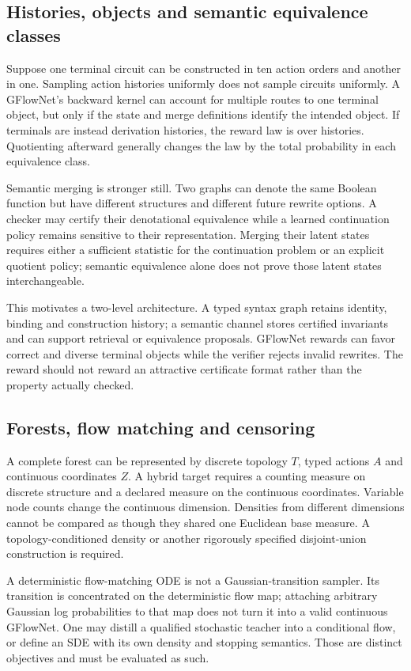 \subsection{Histories, objects and semantic equivalence classes}

Suppose one terminal circuit can be constructed in ten action orders and another in one. Sampling action histories uniformly does not sample circuits uniformly. A GFlowNet's backward kernel can account for multiple routes to one terminal object, but only if the state and merge definitions identify the intended object. If terminals are instead derivation histories, the reward law is over histories. Quotienting afterward generally changes the law by the total probability in each equivalence class.

Semantic merging is stronger still. Two graphs can denote the same Boolean function but have different structures and different future rewrite options. A checker may certify their denotational equivalence while a learned continuation policy remains sensitive to their representation. Merging their latent states requires either a sufficient statistic for the continuation problem or an explicit quotient policy; semantic equivalence alone does not prove those latent states interchangeable.

This motivates a two-level architecture. A typed syntax graph retains identity, binding and construction history; a semantic channel stores certified invariants and can support retrieval or equivalence proposals. GFlowNet rewards can favor correct and diverse terminal objects while the verifier rejects invalid rewrites. The reward should not reward an attractive certificate format rather than the property actually checked.

\subsection{Forests, flow matching and censoring}

A complete forest can be represented by discrete topology $T$, typed actions $A$ and continuous coordinates $Z$. A hybrid target requires a counting measure on discrete structure and a declared measure on the continuous coordinates. Variable node counts change the continuous dimension. Densities from different dimensions cannot be compared as though they shared one Euclidean base measure. A topology-conditioned density or another rigorously specified disjoint-union construction is required.

A deterministic flow-matching ODE is not a Gaussian-transition sampler. Its transition is concentrated on the deterministic flow map; attaching arbitrary Gaussian log probabilities to that map does not turn it into a valid continuous GFlowNet. One may distill a qualified stochastic teacher into a conditional flow, or define an SDE with its own density and stopping semantics. Those are distinct objectives and must be evaluated as such.

